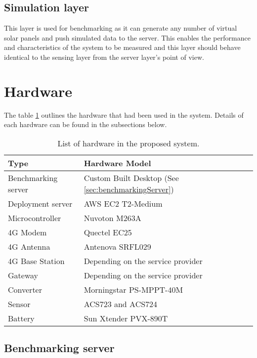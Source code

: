\documentclass[../thesis.tex]{subfiles}
\begin{document}
\subsection{Simulation layer}

This layer is used for benchmarking as it can generate any number of virtual solar panels and push simulated data to the server. This enables the performance and characteristics of the system to be measured and this layer should behave identical to the sensing layer from the server layer's point of view.

\newpage
\section{Hardware}

The table \ref{tab:hardwareList} outlines the hardware that had been used in the system. Details of each hardware can be found in the subsections below. 

\begin{table}[h!]
	\begin{center}
		\caption{List of hardware in the proposed system.}
		\label{tab:hardwareList}
		\begin{tabular}{l|l}
			\toprule
			\textbf{Type} & \textbf{Hardware Model}\\
			\midrule
			Benchmarking server & Custom Built Desktop (See \autoref{sec:benchmarkingServer})\\
			Deployment server & AWS EC2 T2-Medium\\
			Microcontroller & Nuvoton M263A\\
			4G Modem & Quectel EC25\\
			4G Antenna & Antenova SRFL029\\
			4G Base Station & Depending on the service provider\\
			Gateway & Depending on the service provider\\
			Converter & Morningstar PS-MPPT-40M\\
			Sensor & ACS723 and ACS724\\
			Battery & Sun Xtender PVX-890T\\
			\bottomrule
		\end{tabular}
	\end{center}
\end{table}

\subsection{Benchmarking server}
\label{sec:benchmarkingServer}
\end{document}
